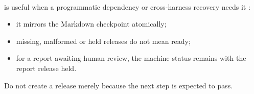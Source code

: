 \paragraph{} is useful when a programmatic dependency or cross-harness
recovery needs it \cite[Handoff marker]{skill:jobs}:
\begin{itemize}
  \item it mirrors the Markdown checkpoint atomically;
  \item missing, malformed or held releases do not mean ready;
  \item for a report awaiting human review, the machine status remains  with
        the report release held.
\end{itemize}

\begin{rulebox}
  Do not create a release merely because the next step is expected to pass.
\end{rulebox}
